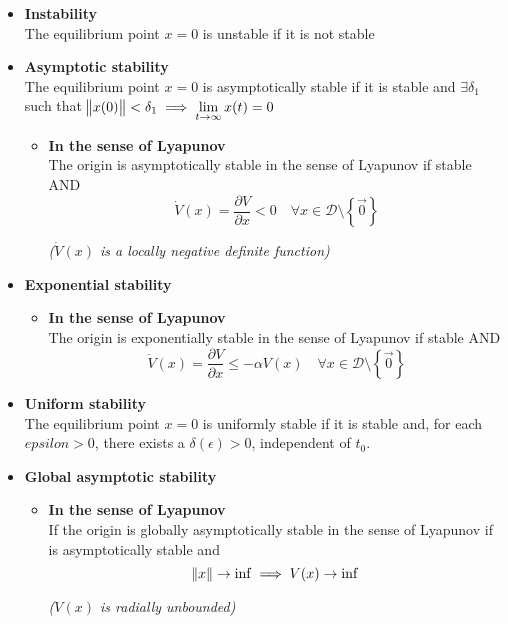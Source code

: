 {\begin{itemize}
    
    \item \textbf{Instability}\\
    The equilibrium point $x=0$ is unstable if it is not stable
    
    
    \item \textbf{Asymptotic stability}\\
    The equilibrium point $x=0$ is asymptotically stable if it is stable and $\exists \delta_1$ such that $\norm{x(0)}<\delta_1 \implies \lim\limits_{t\rightarrow\infty}x(t)=0$

    \begin{itemize}
        \item \textbf{In the sense of Lyapunov}\\
        The origin is asymptotically stable in the sense of Lyapunov if stable AND
        \[\dot{V}(x)=\frac{\partial V}{\partial x} < 0 \quad \forall x \in \mathcal{D}\setminus\left\{\Vec{0}\right\}\]
        \begin{center}
            \textit{($\dot{V}(x)$ is a locally negative definite function)}
        \end{center}
    \end{itemize}
    
    \item \textbf{Exponential stability}\\  
    \begin{itemize}
        \item \textbf{In the sense of Lyapunov}\\
        The origin is exponentially stable in the sense of Lyapunov if stable AND
        \[\dot{V}(x)=\frac{\partial V}{\partial x} \leq -\alpha V(x) \quad \forall x \in \mathcal{D}\setminus\left\{\Vec{0}\right\}\]
    \end{itemize}
    
    \item \textbf{Uniform stability}\\
    The equilibrium point $x=0$ is uniformly stable if it is stable and, for each $epsilon>0$, there exists a $\delta(\epsilon)>0$, independent of $t_0$.
    
    \item \textbf{Global asymptotic stability}\\
    \begin{itemize}
        \item \textbf{In the sense of Lyapunov}\\
        If the origin is globally asymptotically stable in the sense of Lyapunov if is asymptotically stable and 
        \[\norm{x}\rightarrow\inf \implies V(x)\rightarrow\inf\]
        \begin{center}
            \textit{($V(x)$ is radially unbounded)}
        \end{center}
    \end{itemize}
    

\end{itemize}}
